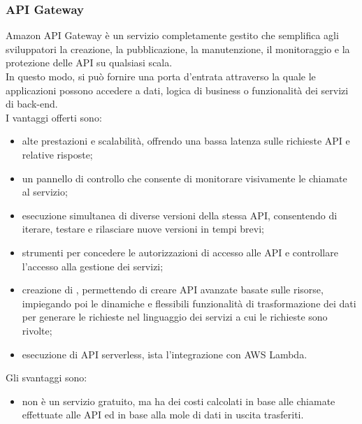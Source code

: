 \subsubsection{API Gateway}
Amazon API Gateway è un servizio completamente gestito che semplifica agli sviluppatori la creazione, la pubblicazione, la manutenzione, il monitoraggio e la protezione delle API su qualsiasi scala.\\
In questo modo, si può fornire una porta d'entrata attraverso la quale le applicazioni possono accedere a dati, logica di business o funzionalità dei servizi di back-end.\\
I vantaggi offerti sono:
\begin{itemize}
	\item alte prestazioni e scalabilità, offrendo una bassa latenza sulle richieste API e relative risposte;
	\item un pannello di controllo che consente di monitorare visivamente le chiamate al servizio;
	\item esecuzione simultanea di diverse versioni della stessa API, consentendo di iterare, testare e rilasciare nuove versioni in tempi brevi;
	\item strumenti per concedere le autorizzazioni di accesso alle API e controllare l'accesso alla gestione dei servizi;
	\item creazione di  , permettendo di creare API avanzate basate sulle risorse, impiegando poi le dinamiche e flessibili funzionalità di trasformazione dei dati per generare le richieste nel linguaggio dei servizi a cui le richieste sono rivolte;
	\item esecuzione di API serverless, ista l'integrazione con AWS Lambda.
\end{itemize}
Gli svantaggi sono:
\begin{itemize}
	\item non è un servizio gratuito, ma ha dei costi calcolati in base alle chiamate effettuate alle API ed in base alla mole di dati in uscita trasferiti.
\end{itemize}
\newpage
